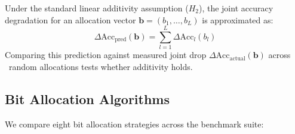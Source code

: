 \documentclass{ieeeaccess}
\begin{document}
Under the standard linear additivity assumption ($H_2$), the joint accuracy degradation for an allocation vector $\mathbf{b} = (b_1, \dots, b_L)$ is approximated as:
\begin{equation}
\label{eq:additivity}
\Delta \text{Acc}_{\text{pred}}(\mathbf{b}) = \sum_{l=1}^{L} \Delta \text{Acc}_l(b_l)
\end{equation}
Comparing this prediction against measured joint drop $\Delta \text{Acc}_{\text{actual}}(\mathbf{b})$ across \MacroRandomAllocCount\ random allocations tests whether additivity holds.

\subsection{Bit Allocation Algorithms}
We compare eight bit allocation strategies across the benchmark suite:
\end{document}
